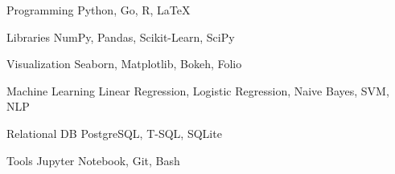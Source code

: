 

\begin{cvskills}
	
	\cvskill
	{Programming} %
	{Python, Go, R, LaTeX} %
	
	\cvskill
	{Libraries} %
	{NumPy, Pandas, Scikit-Learn, SciPy} %
	
	\cvskill
	{Visualization} %
	{Seaborn, Matplotlib, Bokeh, Folio} %
	
	\cvskill
	{Machine Learning} %
	{Linear Regression, Logistic Regression, 
		Naive Bayes, SVM, NLP} %
	
	\cvskill
	{Relational DB} %
	{PostgreSQL, T-SQL, SQLite} %
	
	\cvskill
	{Tools} %
	{Jupyter Notebook, Git, Bash} %
	
	
	\vspace*{-4mm}
\end{cvskills}
